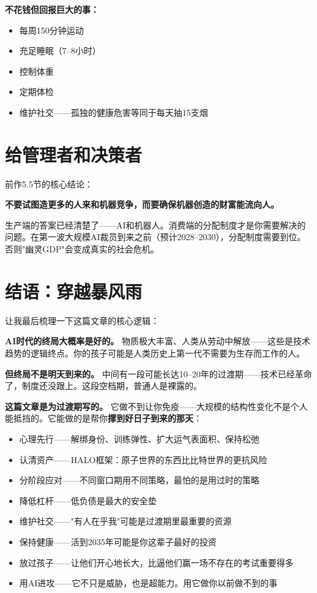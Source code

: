 \documentclass[a4paper,12pt,UTF8]{ctexart}
\begin{document}
\textbf{不花钱但回报巨大的事：}
\begin{itemize}
\item 每周150分钟运动
\item 充足睡眠（7--8小时）
\item 控制体重
\item 定期体检
\item 维护社交——孤独的健康危害等同于每天抽15支烟
\end{itemize}

\section{给管理者和决策者}

前作5.5节的核心结论：

\textbf{不要试图造更多的人来和机器竞争，而要确保机器创造的财富能流向人。}

生产端的答案已经清楚了——AI和机器人。消费端的分配制度才是你需要解决的问题。在第一波大规模AI裁员到来之前（预计2028--2030），分配制度需要到位。否则"幽灵GDP"会变成真实的社会危机。

\section{结语：穿越暴风雨}

让我最后梳理一下这篇文章的核心逻辑：

\textbf{AI时代的终局大概率是好的。} 物质极大丰富、人类从劳动中解放——这些是技术趋势的逻辑终点。你的孩子可能是人类历史上第一代不需要为生存而工作的人。

\textbf{但终局不是明天到来的。} 中间有一段可能长达10--20年的过渡期——技术已经革命了，制度还没跟上。这段空档期，普通人是裸露的。

\textbf{这篇文章是为过渡期写的。} 它做不到让你免疫——大规模的结构性变化不是个人能抵挡的。它能做的是帮你\textbf{撑到好日子到来的那天}：

\begin{itemize}
\item 心理先行——解绑身份、训练弹性、扩大运气表面积、保持松弛
\item 认清资产——HALO框架：原子世界的东西比比特世界的更抗风险
\item 分阶段应对——不同窗口期用不同策略，最怕的是用过时的策略
\item 降低杠杆——低负债是最大的安全垫
\item 维护社交——"有人在乎我"可能是过渡期里最重要的资源
\item 保持健康——活到2035年可能是你这辈子最好的投资
\item 放过孩子——让他们开心地长大，比逼他们赢一场不存在的考试重要得多
\item 用AI进攻——它不只是威胁，也是超能力。用它做你以前做不到的事
\end{itemize}
\end{document}
